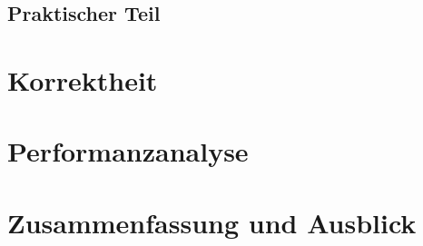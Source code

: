 \documentclass[course=erap]{aspdoc}
\begin{document}
\subsection{Praktischer Teil}
\section{Korrektheit}


\section{Performanzanalyse}


\section{Zusammenfassung und Ausblick}


{}
\end{document}
